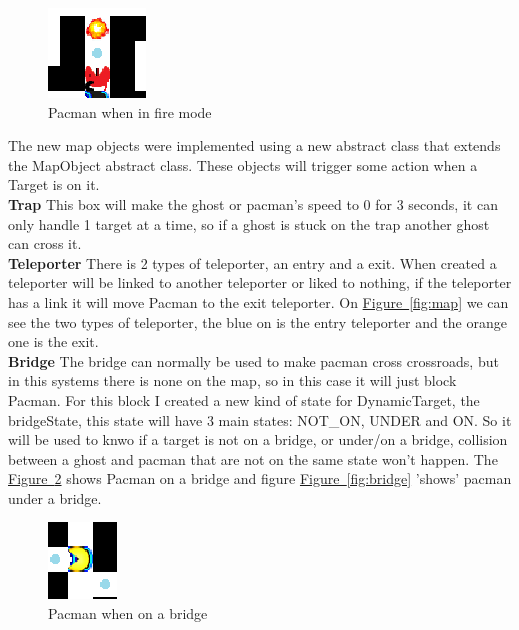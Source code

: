\documentclass[]{article}
\newcommand{\wordlink}[2]{\hyperref[#2]{#1~\ref{#2}}}
\begin{document}
\begin{figure}[h!]
\centering
\includegraphics[width=0.2\linewidth]{fire.png}
\caption{Pacman when in fire mode}
\label{fig:fire}
\end{figure}

The new map objects were implemented using a new abstract class that extends the MapObject abstract class. These objects will trigger some action when a Target is on it. \\

\textbf{Trap} This box will make the ghost or pacman's  speed to 0 for 3 seconds, it can only handle 1 target at a time, so if a ghost is stuck on the trap another ghost can cross it. \\

\textbf{Teleporter} There is 2 types of teleporter, an entry and a exit. When created a teleporter will be linked to another teleporter or liked to nothing, if the teleporter has a link it will move Pacman to the exit teleporter. On \wordlink{Figure}{fig:map} we can see the two types of teleporter, the blue on is the entry teleporter and the orange one is the exit. \\

\textbf{Bridge} The bridge can normally be used to make pacman cross crossroads, but in this systems there is none on the map, so in this case it will just block Pacman. For this block I created a new kind of state for DynamicTarget, the bridgeState, this state will have 3 main states: NOT\_ON, UNDER and ON. So it will be used to knwo if a target is not on a bridge, or under/on a bridge, collision between a ghost and pacman that are not on the same state won't happen. The  \wordlink{Figure}{fig:bridgeU} shows Pacman on a bridge and figure \wordlink{Figure}{fig:bridge} 'shows' pacman under a bridge.\\

\begin{figure}[h!]
\centering
\includegraphics[width=0.2\linewidth]{bridge2.png}
\caption{Pacman when on a bridge}
\label{fig:bridgeU}
\end{figure}
\end{document}

